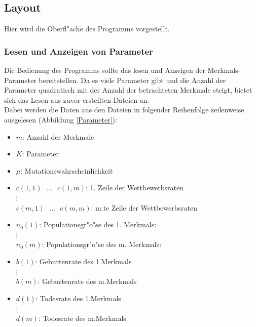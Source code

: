 \documentclass[11pt, a4paper, german]{article}
\theoremstyle{plain}
\begin{document}
	\subsection{Layout}
	Hier wird die Oberfl"ache des Programms vorgestellt.
	\subsubsection{Lesen und Anzeigen von Parameter}
	Die Bedienung des Programms sollte das lesen und Anzeigen der Merkmals-Parameter bereitstellen. Da es viele Parameter gibt und die Anzahl der Parameter quadratisch mit der Anzahl der betrachteten Merkmale steigt, bietet sich das Lesen aus zuvor erstellten Dateien an.\\
	Dabei werden die Daten aus den Dateien in folgender Reihenfolge zeilenweise ausgelesen (Abbildung \ref{Parameter}):
	\begin{itemize}
		\item $ m $: Anzahl der Merkmale
		\item $ K $: Parameter
		\item $ \mu $: Mutationswahrscheinlichkeit
		\item $ c(1,1) \text{ } \dots \text{ } c(1,m) $: 1. Zeile der Wettbewerbsraten \\
			$ \vdots $\\
			$ c(m,1) \text{ } \dots \text{ } c(m,m) $: m.te Zeile der Wettbewerbsraten 
		\item $ n_0(1) $: Populationsgr"o"se des 1. Merkmals: \\
			$ \vdots $\\
			$ n_0(m) $: Populationsgr"o"se des m. Merkmals: 
		\item $ b(1) $: Geburtenrate des 1.Merkmals\\
			$ \vdots $\\
			$ b(m) $: Geburtenrate des m.Merkmals
		\item $ d(1) $: Todesrate des 1.Merkmals\\
			$ \vdots $\\
			$ d(m) $: Todesrate des m.Merkmals
	\end{itemize}
	
\end{document}
